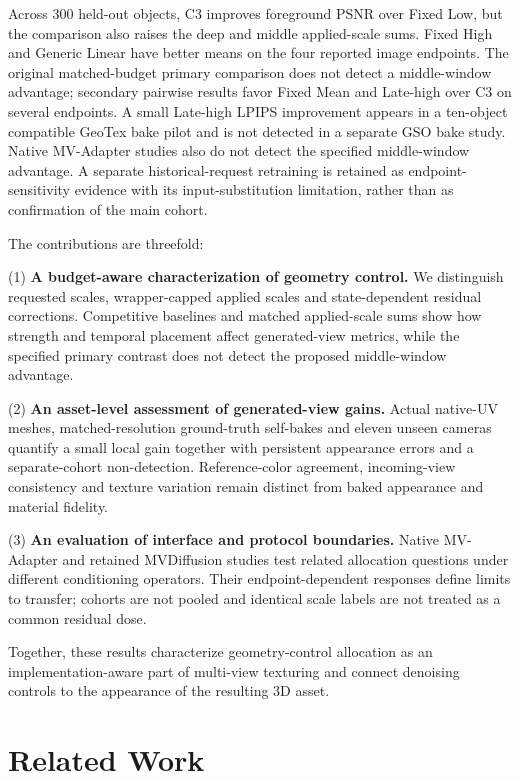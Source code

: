 \documentclass[times,twocolumn,final]{elsarticle}
\begin{document}
Across 300 held-out objects, C3 improves foreground PSNR over Fixed Low, but the comparison also raises the deep and middle applied-scale sums. Fixed High and Generic Linear have better means on the four reported image endpoints. The original matched-budget primary comparison does not detect a middle-window advantage; secondary pairwise results favor Fixed Mean and Late-high over C3 on several endpoints. A small Late-high LPIPS improvement appears in a ten-object compatible GeoTex bake pilot and is not detected in a separate GSO bake study. Native MV-Adapter studies also do not detect the specified middle-window advantage. A separate historical-request retraining is retained as endpoint-sensitivity evidence with its input-substitution limitation, rather than as confirmation of the main cohort.

The contributions are threefold:

(1) \textbf{A budget-aware characterization of geometry control.} We distinguish requested scales, wrapper-capped applied scales and state-dependent residual corrections. Competitive baselines and matched applied-scale sums show how strength and temporal placement affect generated-view metrics, while the specified primary contrast does not detect the proposed middle-window advantage.

(2) \textbf{An asset-level assessment of generated-view gains.} Actual native-UV meshes, matched-resolution ground-truth self-bakes and eleven unseen cameras quantify a small local gain together with persistent appearance errors and a separate-cohort non-detection. Reference-color agreement, incoming-view consistency and texture variation remain distinct from baked appearance and material fidelity.

(3) \textbf{An evaluation of interface and protocol boundaries.} Native MV-Adapter and retained MVDiffusion studies test related allocation questions under different conditioning operators. Their endpoint-dependent responses define limits to transfer; cohorts are not pooled and identical scale labels are not treated as a common residual dose.

Together, these results characterize geometry-control allocation as an implementation-aware part of multi-view texturing and connect denoising controls to the appearance of the resulting 3D asset.

\section{Related Work}
\label{sec:related}
\end{document}
